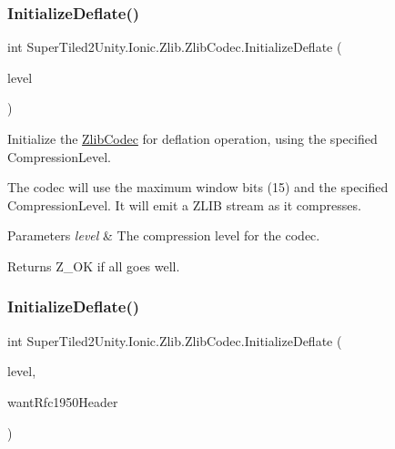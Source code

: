 \subsubsection{\texorpdfstring{Initialize\+Deflate()}{InitializeDeflate()}\hspace{0.1cm}{\footnotesize\ttfamily [2/5]}}
{\footnotesize\ttfamily int Super\+Tiled2\+Unity.\+Ionic.\+Zlib.\+Zlib\+Codec.\+Initialize\+Deflate (\begin{DoxyParamCaption}\item[{\mbox{\hyperlink{namespace_super_tiled2_unity_1_1_ionic_1_1_zlib_a20f6771804996c363f454ad9765cd7db}{Compression\+Level}}}]{level }\end{DoxyParamCaption})}



Initialize the \mbox{\hyperlink{class_super_tiled2_unity_1_1_ionic_1_1_zlib_1_1_zlib_codec}{Zlib\+Codec}} for deflation operation, using the specified Compression\+Level. 

The codec will use the maximum window bits (15) and the specified Compression\+Level. It will emit a Z\+L\+IB stream as it compresses. 


\begin{DoxyParams}{Parameters}
{\em level} & The compression level for the codec.\\
\hline
\end{DoxyParams}
\begin{DoxyReturn}{Returns}
Z\+\_\+\+OK if all goes well.
\end{DoxyReturn}
\mbox{\label{class_super_tiled2_unity_1_1_ionic_1_1_zlib_1_1_zlib_codec_a9fb0d3886b2c4739307430311bf5eb3a}} 
\subsubsection{\texorpdfstring{Initialize\+Deflate()}{InitializeDeflate()}\hspace{0.1cm}{\footnotesize\ttfamily [3/5]}}
{\footnotesize\ttfamily int Super\+Tiled2\+Unity.\+Ionic.\+Zlib.\+Zlib\+Codec.\+Initialize\+Deflate (\begin{DoxyParamCaption}\item[{\mbox{\hyperlink{namespace_super_tiled2_unity_1_1_ionic_1_1_zlib_a20f6771804996c363f454ad9765cd7db}{Compression\+Level}}}]{level,  }\item[{bool}]{want\+Rfc1950\+Header }\end{DoxyParamCaption})}



